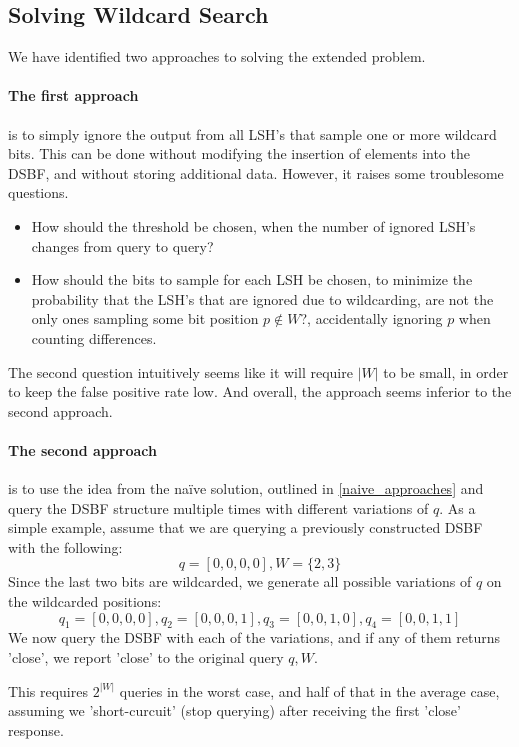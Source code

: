 \documentclass[a4paper,11pt]{article}
\begin{document}
\subsection{Solving Wildcard Search}
We have identified two approaches to solving the extended problem.
\paragraph{The first approach} is to simply ignore the output from all LSH's that sample one or more wildcard bits. This can be done without modifying the insertion of elements into the DSBF, and without storing additional data. However, it raises some troublesome questions.

\begin{itemize}
\item How should the threshold be chosen, when the number of ignored LSH's changes from query to query?
\item How should the bits to sample for each LSH be chosen, to minimize the probability that the LSH's that are ignored due to wildcarding, are not the only ones sampling some bit position $p \notin W$?, accidentally ignoring $p$ when counting differences.
\end{itemize}

The second question intuitively seems like it will require $|W|$ to be small, in order to keep the false positive rate low. And overall, the approach seems inferior to the second approach.

\paragraph{The second approach} is to use the idea from the naïve solution, outlined in \ref{naive_approaches} and query the DSBF structure multiple times with different variations of $q$. As a simple example, assume that we are querying a previously constructed DSBF with the following:
\[q=[0,0,0,0], W=\{2,3\}\]
Since the last two bits are wildcarded, we generate all possible variations of $q$ on the wildcarded positions:
\[q_1=[0,0,0,0], q_2=[0,0,0,1], q_3=[0,0,1,0], q_4=[0,0,1,1]\]
We now query the DSBF with each of the variations, and if any of them returns 'close', we report 'close' to the original query $q, W$.

This requires $2^{|W|}$ queries in the worst case, and half of that in the average case, assuming we 'short-curcuit' (stop querying) after receiving the first 'close' response. 
\end{document}
